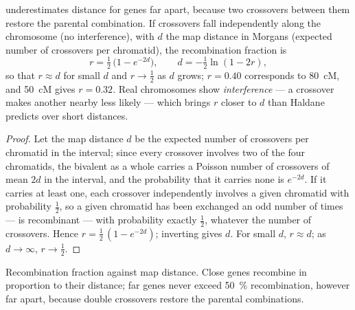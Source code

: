 \begin{theorem}\label{thm:b2:meiosis-heredity:haldane}
 underestimates distance for genes far
apart, because two crossovers between them restore the parental
combination. If crossovers fall independently along the chromosome
(no interference), with $d$ the map distance in Morgans (expected
number of crossovers per chromatid), the recombination fraction is
\[
r = \tfrac12\,\bigl(1 - e^{-2d}\bigr), \qquad d = -\tfrac12\ln(1 - 2r),
\]
so that $r \approx d$ for small $d$ and $r \to \tfrac12$ as $d$
grows; $r = 0.40$ corresponds to \qty{80}{cM}, and \qty{50}{cM}
gives $r = 0.32$. Real chromosomes show \emph{interference} --- a
crossover makes another nearby less likely --- which brings $r$
closer to $d$ than Haldane predicts over short distances.
\end{theorem}
\begin{proof}
Let the map distance $d$ be the expected number of crossovers per
chromatid in the interval; since every crossover involves two of the
four chromatids, the bivalent as a whole carries a Poisson number of
crossovers of mean $2d$ in the interval, and the probability that it
carries none is $e^{-2d}$. If it carries at least one, each crossover
independently involves a given chromatid with probability
$\tfrac12$, so a given chromatid has been exchanged an odd number of
times --- is recombinant --- with probability exactly $\tfrac12$,
whatever the number of crossovers. Hence $r = \tfrac12\,(1 -
e^{-2d})$; inverting gives $d$. For small $d$, $r \approx d$; as
$d \to \infty$, $r \to \tfrac12$.
\end{proof}

\begin{omfigure}

{\small Recombination fraction against map distance. Close genes
recombine in proportion to their distance; far genes never exceed
\qty{50}{\%} recombination, however far apart, because double
crossovers restore the parental combinations.}
\end{omfigure}


